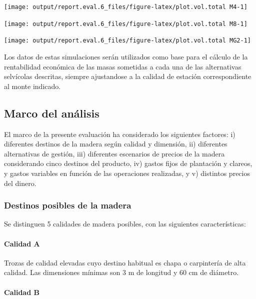 \documentclass[]{article}
\let\oldparagraph\paragraph
\renewcommand{\paragraph}[1]{\oldparagraph{#1}\mbox{}}
\begin{document}
\begin{center}\texttt{[image: output/report.eval.6\_files/figure-latex/plot.vol.total M4-1]} \end{center}

\begin{center}\texttt{[image: output/report.eval.6\_files/figure-latex/plot.vol.total M8-1]} \end{center}

\begin{center}\texttt{[image: output/report.eval.6\_files/figure-latex/plot.vol.total MG2-1]} \end{center}

Los datos de estas simulaciones serán utilizados como base para el
cálculo de la rentabilidad económica de las masas sometidas a cada una
de las alternativas selvícolas descritas, siempre ajustandose a la
calidad de estación correspondiente al monte indicado.

\subsection{Marco del análisis}\label{marco-del-anuxe1lisis}

El marco de la presente evaluación ha considerado los siguientes
factores: i) diferentes destinos de la madera según calidad y dimensión,
ii) diferentes alternativas de gestión, iii) diferentes escenarios de
precios de la madera considerando cinco destinos del producto, iv)
gastos fijos de plantación y clareos, y gastos variables en función de
las operaciones realizadas, y v) distintos precios del dinero.

\subsubsection{Destinos posibles de la
madera}\label{destinos-posibles-de-la-madera}

Se distinguen 5 calidades de madera posibles, con las siguientes
características:

\paragraph{Calidad A}\label{calidad-a}

Trozas de calidad elevadas cuyo destino habitual es chapa o carpintería
de alta calidad. Las dimensiones mínimas son 3 m de longitud y 60 cm de
diámetro.

\paragraph{Calidad B}\label{calidad-b}
\end{document}

